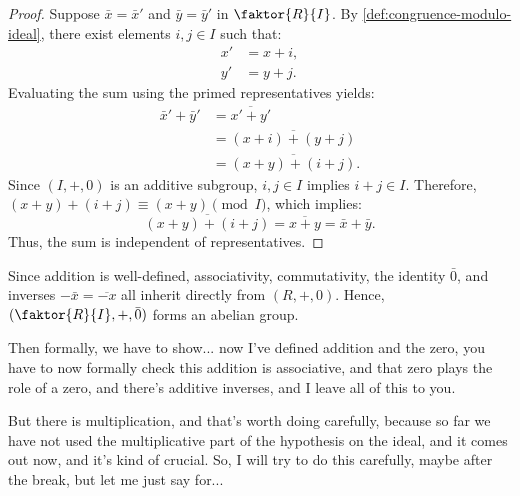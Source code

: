 \begin{content}

\begin{proof}
Suppose $\bar{x} = \bar{x}'$ and $\bar{y} = \bar{y}'$ in $\faktor{R}{I}$. By \cref{def:congruence-modulo-ideal}, there exist elements $i, j \in I$ such that:
\begin{align}
x' &= x + i, \label{eq:x-prime-shift} \\
y' &= y + j. \label{eq:y-prime-shift}
\end{align}
Evaluating the sum using the primed representatives yields:
\begin{align*}
\bar{x}' + \bar{y}' &= \overline{x' + y'} \\
&= \overline{(x + i) + (y + j)} \\
&= \overline{(x + y) + (i + j)}.
\end{align*}
Since $(I, +, 0)$ is an additive subgroup, $i, j \in I$ implies $i + j \in I$. Therefore, $(x + y) + (i + j) \equiv (x + y) \pmod I$, which implies:
\[
\overline{(x + y) + (i + j)} = \overline{x + y} = \bar{x} + \bar{y}.
\]
Thus, the sum is independent of representatives.
\end{proof}

\begin{steps}
Since addition is well-defined, associativity, commutativity, the identity $\bar{0}$, and inverses $-\bar{x} = \overline{-x}$ all inherit directly from $(R, +, 0)$. Hence, $(\faktor{R}{I}, +, \bar{0})$ forms an abelian group.
\end{steps}
\end{content}

\begin{speech}[00:42:05 - 00:43:13]
Then formally, we have to show... now I've defined addition and the zero, you have to now formally check this addition is associative, and that zero plays the role of a zero, and there's additive inverses, and I leave all of this to you. 

But there is multiplication, and that's worth doing carefully, because so far we have not used the multiplicative part of the hypothesis on the ideal, and it comes out now, and it's kind of crucial. So, I will try to do this carefully, maybe after the break, but let me just say for...
\end{speech}


